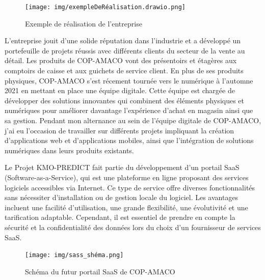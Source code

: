 \documentclass[12pt]{article}
\begin{document}
\begin{figure}[H]
    \centering
    \texttt{[image: img/exempleDeRéalisation.drawio.png]}
    \caption{Exemple de réalisation de l'entreprise}
    \label{fig:enter-label}
\end{figure}
\justify
\text
L'entreprise jouit d'une solide réputation dans l'industrie et a développé un portefeuille de projets réussis avec différents clients du secteur de la vente au détail.  Les produits de COP-AMACO vont des présentoirs et étagères aux comptoirs de caisse et aux guichets de service client.
\justify
\text
En plus de ses produits physiques, COP-AMACO s'est récement tournée vers le numérique à l'automne 2021 en mettant en place une équipe digitale. Cette équipe est chargée de développer des solutions innovantes qui combinent des éléments physiques et numériques pour améliorer  davantage l'expérience d'achat en magasin ainsi que sa gestion.
\justify
\text
Pendant mon alternance au sein de l'équipe digitale de COP-AMACO, j'ai eu l'occasion de travailler sur différents projets impliquant la création d'applications web et d'applications mobiles, ainsi que l'intégration de solutions numériques dans leurs produits existants. 

\justify
\text Le Projet KMO-PREDICT fait partie du développement d'un portail SaaS (Software-as-a-Service), qui est une plateforme en ligne proposant des services logiciels accessibles via Internet. Ce type de service offre diverses fonctionnalités sans nécessiter d'installation ou de gestion locale du logiciel. Les avantages incluent une facilité d'utilisation, une grande flexibilité, une évolutivité et une tarification adaptable. Cependant, il est essentiel de prendre en compte la sécurité et la confidentialité des données lors du choix d'un fournisseur de services SaaS.

\begin{figure}[H]
    \centering
     \texttt{[image: img/sass\_shéma.png]}
    \caption{Schéma du futur portail SaaS de COP-AMACO}
    \label{fig:enter-label}
\end{figure}
    
   
\end{document}
